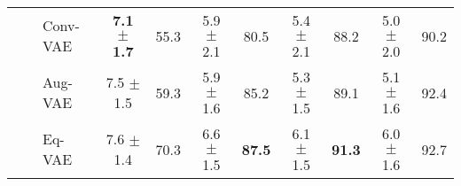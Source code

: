 \begin{table}[t]
\begin{center}
{\begin{tabular}{lll|cc|cc|cc|cc}
&& Conv-VAE & \bf{7.1 $\pm$ 1.7} & 55.3 & 5.9 $\pm$ 2.1 & 80.5 & 5.4 $\pm$ 2.1 & 88.2 & 5.0 $\pm$ 2.0  & 90.2 \\
&& Aug-VAE & 7.5 $\pm$ 1.5 & 59.3 & 5.9 $\pm$ 1.6 & 85.2 & 5.3 $\pm$ 1.5 & 89.1 & 5.1 $\pm$ 1.6  & 92.4  \\
&& Eq-VAE &  7.6 $\pm$ 1.4 & 70.3 & 6.6 $\pm$ 1.5 & \bf{87.5} & 6.1 $\pm$ 1.5 & \bf{91.3} & 6.0 $\pm$ 1.6 & 92.7  \\ \midrule
\bottomrule
\end{tabular}
}
\end{center}
\vspace*{\baselineskip}
\end{table}